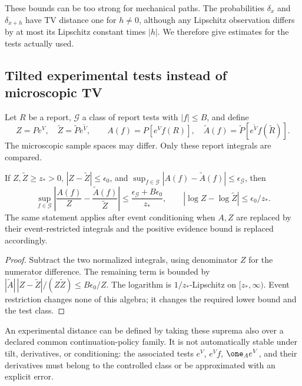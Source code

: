 These bounds can be too strong for mechanical paths. The probabilities $\delta_x$ and $\delta_{x+h}$ have TV distance one for $h\ne0$, although any Lipschitz observation differs by at most its Lipschitz constant times $|h|$. We therefore give estimates for the tests actually used.

\subsection{Tilted experimental tests instead of microscopic TV}
Let $R$ be a report, $\mathcal G$ a class of report tests with $|f|\le B$, and define
\[
 Z=P e^V,\quad \widetilde Z=\widetilde P e^{\widetilde V},\qquad
 A(f)=P[e^Vf(R)],\quad\widetilde A(f)=\widetilde P[e^{\widetilde V}f(\widetilde R)].
\]
The microscopic sample spaces may differ. Only these report integrals are compared.

\begin{theorem}\label{thm:test-tilt}
If $Z,\widetilde Z\ge z_*>0$, $|Z-\widetilde Z|\le\epsilon_0$, and
$\sup_{f\in\mathcal G}|A(f)-\widetilde A(f)|\le\epsilon_\mathcal G$, then
\[
 \sup_{f\in\mathcal G}\left|\frac{A(f)}Z-\frac{\widetilde A(f)}{\widetilde Z}\right|
 \le\frac{\epsilon_\mathcal G+B\epsilon_0}{z_*},
 \qquad |\log Z-\log\widetilde Z|\le\epsilon_0/z_*.
\]
The same statement applies after event conditioning when $A,Z$ are replaced by their event-restricted integrals and the positive evidence bound is replaced accordingly.
\end{theorem}
\begin{proof}
Subtract the two normalized integrals, using denominator $Z$ for the numerator difference. The remaining term is bounded by
$|\widetilde A|\,|Z-\widetilde Z|/(Z\widetilde Z)\le B\epsilon_0/Z$.
The logarithm is $1/z_*$-Lipschitz on $[z_*,\infty)$. Event restriction changes none of this algebra; it changes the required lower bound and the test class.
\end{proof}

An experimental distance can be defined by taking these suprema also over a declared common continuation-policy family. It is not automatically stable under tilt, derivatives, or conditioning: the associated tests $e^V$, $e^Vf$, $\one_Ae^V$, and their derivatives must belong to the controlled class or be approximated with an explicit error.


